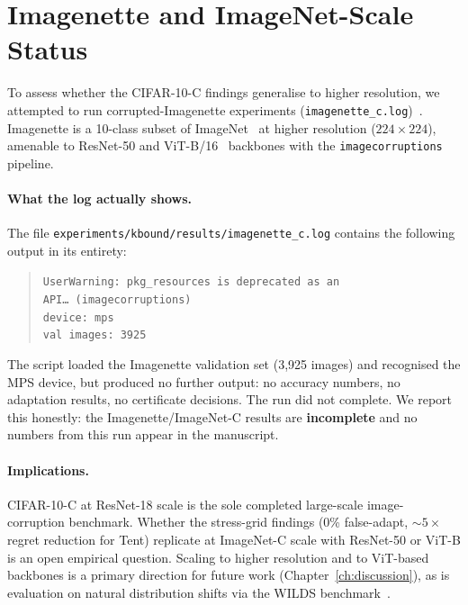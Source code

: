 \section{Imagenette and ImageNet-Scale Status}\label{sec:exp2-imagenette}

To assess whether the CIFAR-10-C findings generalise to higher resolution, we
attempted to run corrupted-Imagenette experiments
(\texttt{imagenette\_c.log})~\cite{howard2019imagenette}.  Imagenette is a
10-class subset of ImageNet~\cite{deng2009imagenet} at higher resolution
($224{\times}224$), amenable to ResNet-50 and ViT-B/16~\cite{dosovitskiy2021vit,
he2016resnet} backbones with the \texttt{imagecorruptions} pipeline.

\paragraph{What the log actually shows.}
The file \texttt{experiments/kbound/results/imagenette\_c.log} contains the
following output in its entirety:
\begin{quote}
\texttt{UserWarning: pkg\_resources is deprecated as an API\ldots\ (imagecorruptions)}\\
\texttt{device: mps}\\
\texttt{val images: 3925}
\end{quote}
The script loaded the Imagenette validation set (3,925 images) and recognised the
MPS device, but produced no further output: no accuracy numbers, no adaptation
results, no certificate decisions.  The run did not complete.  We report this
honestly: the Imagenette/ImageNet-C results are \textbf{incomplete} and no
numbers from this run appear in the manuscript.

\paragraph{Implications.}
CIFAR-10-C at ResNet-18 scale is the sole completed large-scale image-corruption
benchmark.  Whether the stress-grid findings (0\% false-adapt, ${\sim}5{\times}$
regret reduction for Tent) replicate at ImageNet-C scale with ResNet-50 or ViT-B
is an open empirical question.  Scaling to higher resolution and to
ViT-based backbones is a primary direction for future work
(Chapter~\ref{ch:discussion}), as is evaluation on natural distribution shifts
via the WILDS benchmark~\cite{koh2021wilds}.

